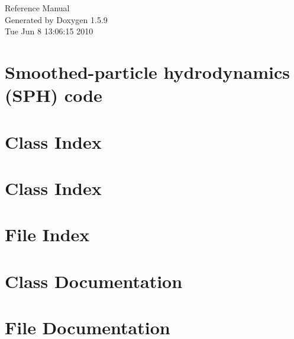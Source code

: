 \documentclass[a4paper]{book}
\begin{document}
\hypersetup{pageanchor=false}
\begin{titlepage}
\vspace*{7cm}
\begin{center}
{\Large Reference Manual}\\
\vspace*{1cm}
{\large Generated by Doxygen 1.5.9}\\
\vspace*{0.5cm}
{\small Tue Jun 8 13:06:15 2010}\\
\end{center}
\end{titlepage}
\clearemptydoublepage
{}
\tableofcontents
\clearemptydoublepage
{}
\hypersetup{pageanchor=true}
\chapter{Smoothed-particle hydrodynamics (SPH) code}
\label{index}\hypertarget{index}{}
\chapter{Class Index}

\chapter{Class Index}

\chapter{File Index}

\chapter{Class Documentation}


















\chapter{File Documentation}


































\printindex
\end{document}
